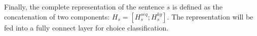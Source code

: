 Finally, the complete representation of the sentence $s$ is defined as
the concatenation of two components: $H_s=[H_s^{seq}; H_s^{kg}]$. The representation 
will be fed into a fully connect layer for choice classification. 


%
%

